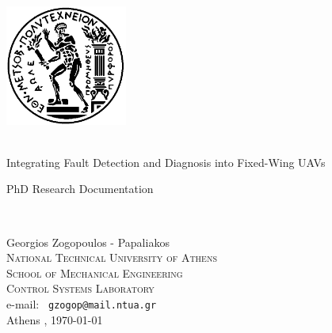 \begin{titlepage}
\begin{center}
\includegraphics[width=0.3\textwidth]{./ntua_logo}~\\[1cm]

\HRule \\
\linespread{1.5}
\begin{huge}
Integrating Fault Detection and Diagnosis into Fixed-Wing UAVs \\
\end{huge}
\begin{LARGE}
PhD Research Documentation
\par
\end{LARGE}
\HRule \\

\vfill

{\Large
Georgios Zogopoulos - Papaliakos
} \\[0.3cm]
\textsc{\large 
National Technical University of Athens
}\\
\textsc{School of Mechanical Engineering\\ Control Systems Laboratory} \\[0.3cm]
e-mail: \texttt{
gzogop@mail.ntua.gr
} \\[1cm]
{
Athens
, \today}

	

\end{center}

\end{titlepage}